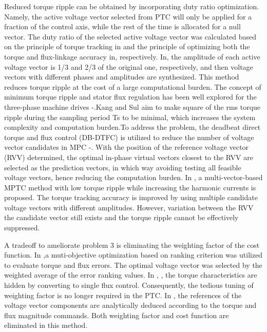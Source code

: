 \documentclass[sn-basic]{sn-jnl}
\theoremstyle{thmstyleone}%
\theoremstyle{thmstyletwo}%
\theoremstyle{thmstylethree}%
\theoremstyle{thmstyleone}%
\begin{document}
Reduced torque ripple can be obtained by incorporating duty ratio optimization\citep{6725678,9032330}. Namely, the active voltage vector selected from PTC will only be applied for a fraction of the control axis, while the rest of the time is allocated for a null vector. The duty ratio of the selected active voltage vector was calculated based on the principle of torque tracking in \cite{9032330} and the principle of optimizing both the torque and flux-linkage accuracy in\cite{8264763}, respectively. In\cite{7815310}, the amplitude of each active voltage vector is 1/3 and 2/3 of the original one, respectively, and then voltage vectors with different phases and amplitudes are synthesized. This method reduces torque ripple at the cost of a large computational burden. The concept of minimum torque ripple and stator flux regulation has been well explored for the three-phase machine drives {\cite{793368}}-{\cite{5512651}.Kang and Sul{\cite{793368}} aim to make square of the rms torque ripple during the sampling period Ts to be minimal, which increases the system complexity and computation burden.To address the problem,} the deadbeat direct torque and flux control (DB-DTFC) is utilized to reduce the number of voltage vector candidates in MPC \cite{8657983}-\cite{7893710}. With the position of the reference voltage vector (RVV) determined, the optimal in-phase virtual vectors closest to the RVV are selected as the prediction vectors, in which way avoiding testing all feasible voltage vectors, hence reducing the computation burden. In {\cite{article}}, a multi-vector-based MPTC method with low torque ripple while increasing the harmonic currents is proposed. The torque tracking accuracy is improved by using multiple candidate voltage vectors with different amplitudes. However, variation between the RVV the candidate vector still exists and the torque ripple cannot be effectively suppressed.

A tradeoff to ameliorate problem 3 is eliminating the weighting factor of the cost function. In \cite{6239590},a muti-objective optimization based on ranking criterion was utilized to evaluate torque and flux errors. The optimal voltage vector was selected by the weighted average of the error ranking values. In \cite{8307116}, \cite{8811491}, the torque characteristics are hidden by converting to single flux control. Consequently, the tedious tuning of weighting factor is no longer required in the PTC. In \cite{9275312}, the references of the voltage vector components are analytically deduced according to the torque and flux magnitude commands. Both weighting factor and cost function are eliminated in this method.
\end{document}
